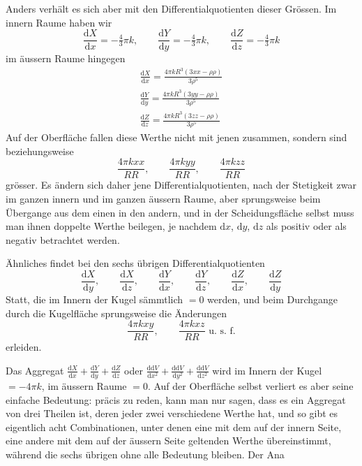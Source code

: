 Anders verhält es sich aber mit den Differentialquotienten dieser Grössen. Im innern Raume haben wir
\[
\frac{\mathrm{d}X}{\mathrm{d}x}=-\tfrac{4}{3}\pi k,\qquad \frac{\mathrm{d}Y}{\mathrm{d}y}=-\tfrac{4}{3}\pi k,\qquad \frac{\mathrm{d}Z}{\mathrm{d}z}=-\tfrac{4}{3}\pi k
\]
im äussern Raume hingegen
\[
\begin{array}{l}
\displaystyle\frac{\mathrm{d}X}{\mathrm{d}x}=\frac{4\pi kR^3(3xx-\rho\rho)}{3\rho^5}\\[6pt]
\displaystyle\frac{\mathrm{d}Y}{\mathrm{d}y}=\frac{4\pi kR^3(3yy-\rho\rho)}{3\rho^5}\\[6pt]
\displaystyle\frac{\mathrm{d}Z}{\mathrm{d}z}=\frac{4\pi kR^3(3zz-\rho\rho)}{3\rho^5}
\end{array}
\]
Auf der Oberfläche fallen diese Werthe nicht mit jenen zusammen, sondern sind beziehungsweise
\[
\frac{4\pi kxx}{RR},\qquad \frac{4\pi kyy}{RR},\qquad \frac{4\pi kzz}{RR}
\]
grösser. Es ändern sich daher jene Differentialquotienten, nach der Stetigkeit zwar im ganzen innern und im ganzen äussern Raume, aber sprungsweise beim Übergange aus dem einen in den andern, und in der Scheidungsfläche selbst muss man ihnen doppelte Werthe beilegen, je nachdem $\mathrm{d}x$, $\mathrm{d}y$, $\mathrm{d}z$ als positiv oder als negativ betrachtet werden.

Ähnliches findet bei den sechs übrigen Differentialquotienten
\[
\frac{\mathrm{d}X}{\mathrm{d}y},\qquad \frac{\mathrm{d}X}{\mathrm{d}z},\qquad \frac{\mathrm{d}Y}{\mathrm{d}x},\qquad \frac{\mathrm{d}Y}{\mathrm{d}z},\qquad \frac{\mathrm{d}Z}{\mathrm{d}x},\qquad \frac{\mathrm{d}Z}{\mathrm{d}y}
\]
Statt, die im Innern der Kugel sämmtlich $=0$ werden, und beim Durchgange durch die Kugelfläche sprungsweise die Änderungen
\[
\frac{4\pi kxy}{RR},\qquad \frac{4\pi kxz}{RR}\text{ u. s. f.}
\]
erleiden.

Das Aggregat $\frac{\mathrm{d}X}{\mathrm{d}x}+\frac{\mathrm{d}Y}{\mathrm{d}y}+\frac{\mathrm{d}Z}{\mathrm{d}z}$ oder $\frac{\mathrm{d}\mathrm{d}V}{\mathrm{d}x^2}+\frac{\mathrm{d}\mathrm{d}V}{\mathrm{d}y^2}+\frac{\mathrm{d}\mathrm{d}V}{\mathrm{d}z^2}$ wird im Innern der Kugel $=-4\pi k$, im äussern Raume $=0$. Auf der Oberfläche selbst verliert es aber seine einfache Bedeutung: präcis zu reden, kann man nur sagen, dass es ein Aggregat von drei Theilen ist, deren jeder zwei verschiedene Werthe hat, und so gibt es eigentlich acht Combinationen, unter denen eine mit dem auf der innern Seite, eine andere mit dem auf der äussern Seite geltenden Werthe übereinstimmt, während die sechs übrigen ohne alle Bedeutung bleiben. Der Ana%
